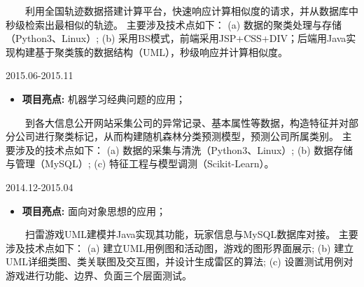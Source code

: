 \documentclass{resume}
\begin{document}
{{ \ \ \ \ 利用全国轨迹数据搭建计算平台，快速响应计算相似度的请求，并从数据库中秒级检索出最相似的轨迹。
主要涉及技术点如下：
(a) 数据的聚类处理与存储（Python3、Linux）;
(b) 采用BS模式，前端采用JSP+CSS+DIV；后端用Java实现构建基于聚类簇的数据结构（UML），秒级响应并计算相似度。 
}

\medskip










              {2015.06-2015.11}

\begin{itemize} [parsep=0.5ex]

  \item   \textbf{ 项目亮点: }  { 机器学习经典问题的应用； }
  
\end{itemize}

{\ \ \ \ 到各大信息公开网站采集公司的异常记录、基本属性等数据，构造特征并对部分公司进行聚类标记，从而构建随机森林分类预测模型，预测公司所属类别。
主要涉及的技术点如下：
(a) 数据的采集与清洗（Python3、Linux）;
(b) 数据存储与管理（MySQL）;
(c) 特征工程与模型调测（Scikit-Learn）。
  
\medskip










                       {2014.12-2015.04}


\begin{itemize} [parsep=0.5ex]

  \item   \textbf{ 项目亮点: }  { 面向对象思想的应用； }
  
\end{itemize}



{\ \ \ \ 扫雷游戏UML建模并Java实现其功能，玩家信息与MySQL数据库对接。
主要涉及技术点如下：
(a) 建立UML用例图和活动图，游戏的图形界面展示;
(b) 建立UML详细类图、类关联图及交互图，并设计生成雷区的算法;
(c) 设置测试用例对游戏进行功能、边界、负面三个层面测试。 
}
  
\medskip

















}}
\end{document}
